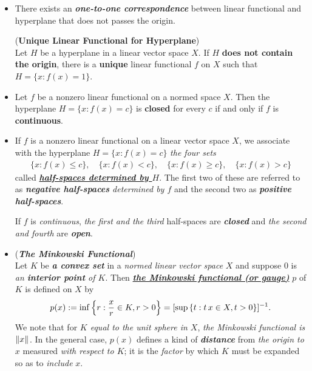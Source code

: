 \documentclass[11pt]{article}
\begin{document}
\begin{itemize}
\item There exists an \emph{\textbf{one-to-one correspondence}} between linear functional and hyperplane that does not passes the origin.
\begin{proposition} (\textbf{Unique Linear Functional for Hyperplane}) \citep{luenberger1997optimization}\\
Let $H$ be a hyperplane in a linear vector space $X$. If $H$ \textbf{does not contain the origin}, there is a \textbf{unique} linear functional $f$ on $X$ such that
$H =\{x: f(x) =1 \}$.
\end{proposition}

\item \begin{proposition}
Let $f$ be a nonzero linear functional on a normed space $X$. Then the hyperplane $H =\{x: f(x) =c\}$ is \textbf{closed} for every $c$ if and only if
$f$ is \textbf{continuous}.
\end{proposition}

\item \begin{remark}
If $f$ is a nonzero linear functional on a linear vector space $X$, we associate with the hyperplane $H =\{x: f(x) =c\}$  \emph{the four sets}
\begin{align*}
\{x: f(x) \le c\}, \quad \{x: f(x) < c\}, \quad \{x: f(x) \ge c\}, \quad \{x: f(x) > c\}
\end{align*}
called \underline{\emph{\textbf{half-spaces determined by $H$}}}. The first two of these are referred to as \emph{\textbf{negative half-spaces} determined by $f$} and the second two as \emph{\textbf{positive half-spaces}}.

If $f$ is \emph{continuous},\emph{ the first and the third} half-spaces are \emph{\textbf{closed}} and \emph{the second and fourth} are \emph{\textbf{open}}.
\end{remark}

\item \begin{definition} (\emph{\textbf{The Minkowski Functional}}) \citep{luenberger1997optimization}\\
Let $K$ be \emph{\textbf{a convex set}} in a \emph{normed linear vector space} $X$ and suppose $0$ is \emph{an \textbf{interior point} of $K$}. Then \underline{\emph{\textbf{the Minkowski functional (or gauge)}}} $p$ of $K$ is defined on $X$ by
\begin{align*}
p(x) := \inf\left\{r: \frac{x}{r} \in K, r > 0\right\} = [\sup\left\{t: t\,x \in X, t > 0\right\}]^{-1}.
\end{align*}
We note that for \emph{$K$ equal to the unit sphere in $X$}, \emph{the Minkowski functional is $\left\|x\right\|_{}$}. In the general case, $p(x)$ defines a kind of \emph{\textbf{distance}} from \emph{the origin to $x$} measured \emph{with respect to $K$}; it is the \emph{factor} by which $K$ must be expanded so as to \emph{include} $x$.
\end{definition}


\end{itemize}
\end{document}
